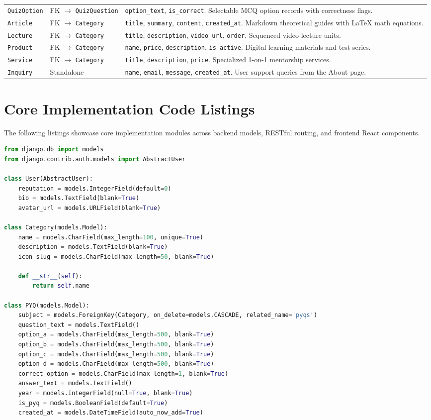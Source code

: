 \begin{table}[H]
\begin{tabularx}{\textwidth}{p{3.2cm} p{4.0cm} X}
\texttt{QuizOption} & FK $\rightarrow$ \texttt{QuizQuestion} & \texttt{option\_text}, \texttt{is\_correct}. Selectable MCQ option records with correctness flags. \\
\texttt{Article} & FK $\rightarrow$ \texttt{Category} & \texttt{title}, \texttt{summary}, \texttt{content}, \texttt{created\_at}. Markdown theoretical guides with LaTeX math equations. \\
\texttt{Lecture} & FK $\rightarrow$ \texttt{Category} & \texttt{title}, \texttt{description}, \texttt{video\_url}, \texttt{order}. Sequenced video lecture units. \\
\texttt{Product} & FK $\rightarrow$ \texttt{Category} & \texttt{name}, \texttt{price}, \texttt{description}, \texttt{is\_active}. Digital learning materials and test series. \\
\texttt{Service} & FK $\rightarrow$ \texttt{Category} & \texttt{title}, \texttt{description}, \texttt{price}. Specialized 1-on-1 mentorship services. \\
\texttt{Inquiry} & Standalone & \texttt{name}, \texttt{email}, \texttt{message}, \texttt{created\_at}. User support queries from the About page. \\
\bottomrule
\end{tabularx}
\end{table}

\section{Core Implementation Code Listings}
The following listings showcase core implementation modules across backend models, RESTful routing, and frontend React components.

\begin{lstlisting}[language=Python, caption={Django Relational Schema Models in core/models.py}]
from django.db import models
from django.contrib.auth.models import AbstractUser

class User(AbstractUser):
    reputation = models.IntegerField(default=0)
    bio = models.TextField(blank=True)
    avatar_url = models.URLField(blank=True)

class Category(models.Model):
    name = models.CharField(max_length=100, unique=True)
    description = models.TextField(blank=True)
    icon_slug = models.CharField(max_length=50, blank=True)

    def __str__(self):
        return self.name

class PYQ(models.Model):
    subject = models.ForeignKey(Category, on_delete=models.CASCADE, related_name='pyqs')
    question_text = models.TextField()
    option_a = models.CharField(max_length=500, blank=True)
    option_b = models.CharField(max_length=500, blank=True)
    option_c = models.CharField(max_length=500, blank=True)
    option_d = models.CharField(max_length=500, blank=True)
    correct_option = models.CharField(max_length=1, blank=True)
    answer_text = models.TextField()
    year = models.IntegerField(null=True, blank=True)
    is_pyq = models.BooleanField(default=True)
    created_at = models.DateTimeField(auto_now_add=True)
\end{lstlisting}

